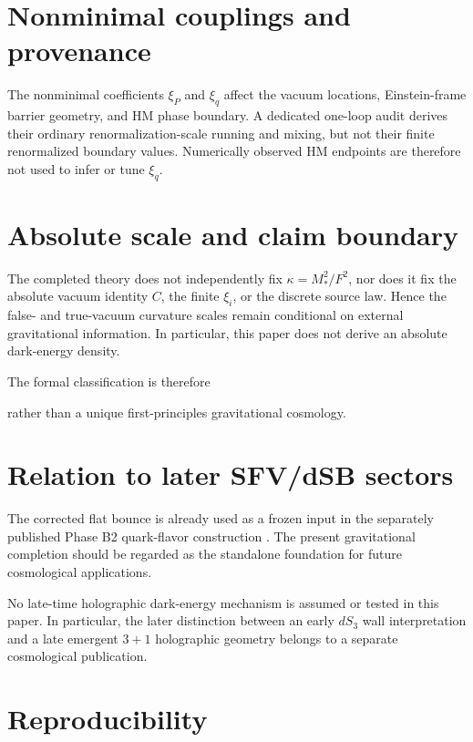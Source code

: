 \documentclass[11pt]{article}
\begin{document}
\section{Nonminimal couplings and provenance}

The nonminimal coefficients $\xi_P$ and $\xi_q$ affect the vacuum locations, Einstein-frame barrier geometry, and HM phase boundary. A dedicated one-loop audit derives their ordinary renormalization-scale running and mixing, but not their finite renormalized boundary values. Numerically observed HM endpoints are therefore not used to infer or tune $\xi_q$.

\section{Absolute scale and claim boundary}

The completed theory does not independently fix $\kappa=M_*^2/F^2$, nor does it fix the absolute vacuum identity $C$, the finite $\xi_i$, or the discrete source law. Hence the false- and true-vacuum curvature scales remain conditional on external gravitational information. In particular, this paper does not derive an absolute dark-energy density.

The formal classification is therefore
\begin{center}
\end{center}
rather than a unique first-principles gravitational cosmology.

\section{Relation to later SFV/dSB sectors}

The corrected flat bounce is already used as a frozen input in the separately published Phase B2 quark-flavor construction \cite{HoffmannPhaseB2}. The present gravitational completion should be regarded as the standalone foundation for future cosmological applications.

No late-time holographic dark-energy mechanism is assumed or tested in this paper. In particular, the later distinction between an early $dS_3$ wall interpretation and a late emergent $3+1$ holographic geometry belongs to a separate cosmological publication.

\section{Reproducibility}
\end{document}
